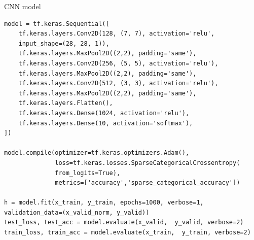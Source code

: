 \documentclass[12pt]{article}
\begin{document}
CNN model
\begin{verbatim}
model = tf.keras.Sequential([
    tf.keras.layers.Conv2D(128, (7, 7), activation='relu', 
    input_shape=(28, 28, 1)),
    tf.keras.layers.MaxPool2D((2,2), padding='same'),
    tf.keras.layers.Conv2D(256, (5, 5), activation='relu'),
    tf.keras.layers.MaxPool2D((2,2), padding='same'),
    tf.keras.layers.Conv2D(512, (3, 3), activation='relu'),
    tf.keras.layers.MaxPool2D((2,2), padding='same'),
    tf.keras.layers.Flatten(),
    tf.keras.layers.Dense(1024, activation='relu'),
    tf.keras.layers.Dense(10, activation='softmax'),
])

model.compile(optimizer=tf.keras.optimizers.Adam(),
              loss=tf.keras.losses.SparseCategoricalCrossentropy(
              from_logits=True),
              metrics=['accuracy','sparse_categorical_accuracy'])

h = model.fit(x_train, y_train, epochs=1000, verbose=1,
validation_data=(x_valid_norm, y_valid))
test_loss, test_acc = model.evaluate(x_valid,  y_valid, verbose=2)
train_loss, train_acc = model.evaluate(x_train,  y_train, verbose=2)
\end{verbatim}
\end{document}
